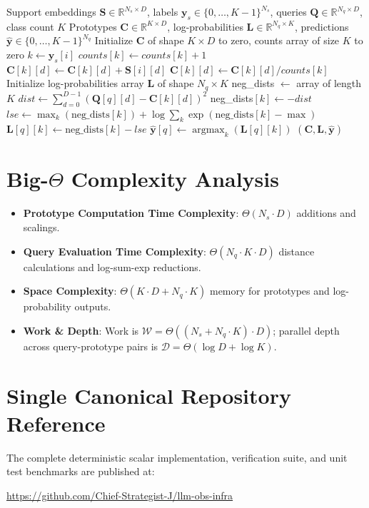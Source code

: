 \documentclass[11pt,a4paper]{article}
\theoremstyle{definition}
\begin{document}
\begin{algorithm}[H]
\caption{Prototypical Networks Prototype Aggregation and Query Softmax}
\begin{algorithmic}[1]
\Require Support embeddings $\mathbf{S} \in \mathbb{R}^{N_s \times D}$, labels $\mathbf{y}_s \in \{0, \dots, K-1\}^{N_s}$, queries $\mathbf{Q} \in \mathbb{R}^{N_q \times D}$, class count $K$
\Ensure Prototypes $\mathbf{C} \in \mathbb{R}^{K \times D}$, log-probabilities $\mathbf{L} \in \mathbb{R}^{N_q \times K}$, predictions $\hat{\mathbf{y}} \in \{0, \dots, K-1\}^{N_q}$
\State Initialize $\mathbf{C}$ of shape $K \times D$ to zero, counts array of size $K$ to zero
    \State $k \gets \mathbf{y}_s[i]$
    \State $counts[k] \gets counts[k] + 1$
        \State $\mathbf{C}[k][d] \gets \mathbf{C}[k][d] + \mathbf{S}[i][d]$
    \EndFor
\EndFor
{}
     \State $\mathbf{C}[k][d] \gets \mathbf{C}[k][d] / counts[k]$ \EndFor
\EndFor
\State Initialize log-probabilities array $\mathbf{L}$ of shape $N_q \times K$
    \State neg\_dists $\gets$ array of length $K$
        \State $dist \gets \sum_{d=0}^{D-1} (\mathbf{Q}[q][d] - \mathbf{C}[k][d])^2$
        \State neg\_dists$[k] \gets -dist$
    \EndFor
    \State $lse \gets \max_k(\text{neg\_dists}[k]) + \log \sum_k \exp(\text{neg\_dists}[k] - \max)$
        \State $\mathbf{L}[q][k] \gets \text{neg\_dists}[k] - lse$
    \EndFor
    \State $\hat{\mathbf{y}}[q] \gets \operatorname{argmax}_k(\mathbf{L}[q][k])$
\EndFor
\State \Return $(\mathbf{C}, \mathbf{L}, \hat{\mathbf{y}})$
\end{algorithmic}
\end{algorithm}

\section{Big-$\Theta$ Complexity Analysis}

\begin{itemize}
    \item \textbf{Prototype Computation Time Complexity}: $\Theta(N_s \cdot D)$ additions and scalings.
    \item \textbf{Query Evaluation Time Complexity}: $\Theta(N_q \cdot K \cdot D)$ distance calculations and log-sum-exp reductions.
    \item \textbf{Space Complexity}: $\Theta(K \cdot D + N_q \cdot K)$ memory for prototypes and log-probability outputs.
    \item \textbf{Work \& Depth}: Work is $\mathcal{W} = \Theta((N_s + N_q \cdot K) \cdot D)$; parallel depth across query-prototype pairs is $\mathcal{D} = \Theta(\log D + \log K)$.
\end{itemize}

\section{Single Canonical Repository Reference}

The complete deterministic scalar implementation, verification suite, and unit test benchmarks are published at:
\begin{center}
\url{https://github.com/Chief-Strategist-J/llm-obs-infra}
\end{center}
\end{document}
